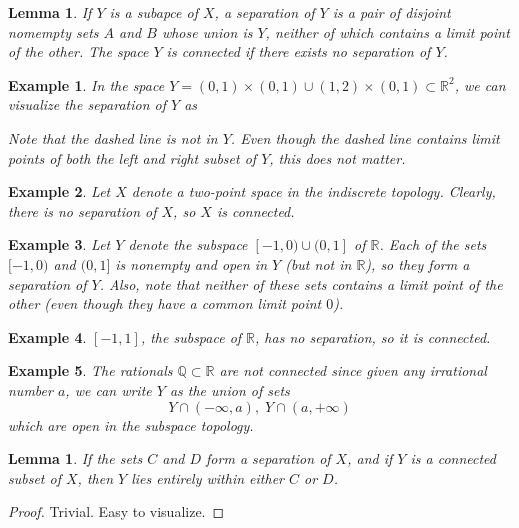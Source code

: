 \documentclass{article}
\newtheorem{lemma}[theorem]{Lemma}
\newtheorem{example}{Example}[section]
\theoremstyle{remark}
\theoremstyle{definition}
\begin{document}
\begin{lemma}
If $Y$ is a subapce of $X$, a separation of $Y$ is a pair of disjoint nomempty sets $A$ and $B$ whose union is $Y$, neither of which contains a limit point of the other. The space $Y$ is connected if there exists no separation of $Y$. 
\end{lemma}
\begin{example}
In the space $Y = (0,1) \times (0,1) \cup (1,2) \times (0,1) \subset \mathbb{R}^2$, we can visualize the separation of $Y$ as
\begin{center}
\end{center}
Note that the dashed line is not in $Y$. Even though the dashed line contains limit points of both the left and right subset of $Y$, this does not matter. 
\end{example}


\begin{example}
Let $X$ denote a two-point space in the indiscrete topology. Clearly, there is no separation of $X$, so $X$ is connected. 
\end{example}

\begin{example}
Let $Y$ denote the subspace $[-1,0) \cup (0,1]$ of $\mathbb{R}$. Each of the sets $[-1,0)$ and $(0,1]$ is nonempty and open in $Y$ (but not in $\mathbb{R}$), so they form a separation of $Y$. Also, note that neither of these sets contains a limit point of the other (even though they have a common limit point $0$). 
\end{example}

\begin{example}
$[-1,1]$, the subspace of $\mathbb{R}$, has no separation, so it is connected. 
\end{example}

\begin{example}
The rationals $\mathbb{Q} \subset \mathbb{R}$ are not connected since given any irrational number $a$, we can write $Y$ as the union of sets
\[Y \cap (-\infty, a), \; Y \cap (a, +\infty)\]
which are open in the subspace topology. 
\end{example}

\begin{lemma}
If the sets $C$ and $D$ form a separation of $X$, and if $Y$ is a connected subset of $X$, then $Y$ lies entirely within either $C$ or $D$. 
\end{lemma}
\begin{proof}
Trivial. Easy to visualize. 
\end{proof}
\end{document}
